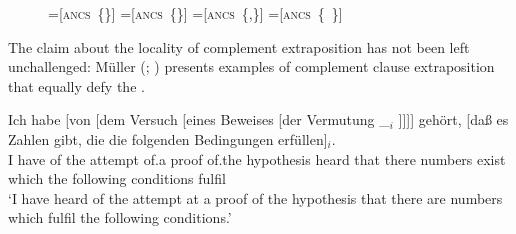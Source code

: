 \documentclass[output=paper
,notxmath 
	        ,collection
	        ,collectionchapter
 	        ,biblatex
                ,babelshorthands
                ,newtxmath
                ,draftmode
                ,colorlinks, citecolor=brown
]{langscibook}
\begin{document}
\begin{figure}
  
  { \newbox\onebox \newbox\twobox \newbox\onetwobox \newbox\emptybox

    \setbox\onebox=\hbox{[\textsc{ancs} \{\}]}
    \setbox\twobox=\hbox{[\textsc{ancs} \{\}]}
    \setbox\onetwobox=\hbox{[\textsc{ancs} \{,\}]}
    \setbox\emptybox=\hbox{[\textsc{ancs} \{ \}]}
}

\end{figure}

The claim about the locality of complement extraposition has not been
left unchallenged: Müller (\citeyear[]{Mueller99a};
\citeyear[]{Mueller2004d}) presents examples of complement
clause extraposition that equally defy the .

\ea
\label{ex-versuch-eines-beweises-der-vermutung} 
{\gll Ich habe [von [dem Versuch [eines Beweises [der Vermutung \_$_i$ ]]]] gehört, [daß es Zahlen gibt, die die folgenden Bedingungen erfüllen]$_i$.\footnotemark\\
      I have \spacebr{}of \spacebr{}the attempt \spacebr{}of.a proof \spacebr{}of.the hypothesis {} {}
      heard \spacebr{}that there numbers exist which the following conditions
      fulfil\\
      \glt `I have heard of the attempt at a proof of the hypothesis
      that there are numbers which fulfil the following conditions.'
    }  
    
\end{document}
